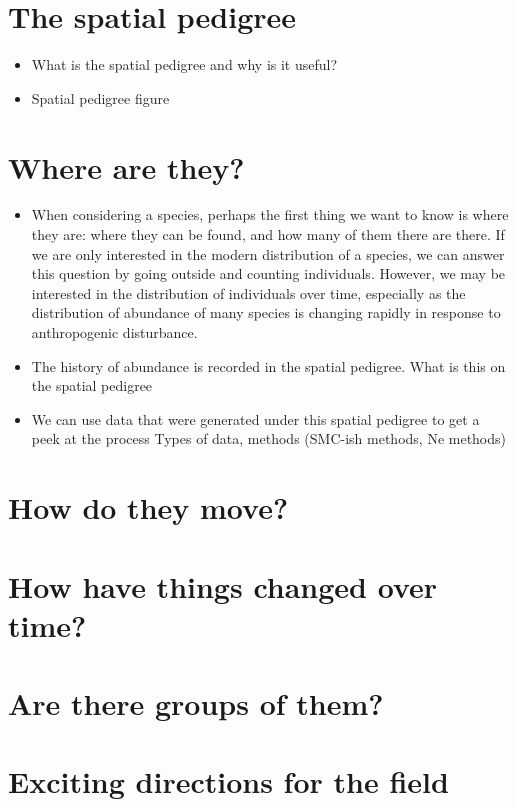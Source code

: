 \documentclass{ar-1col}
\begin{document}
\section{The spatial pedigree}
\begin{itemize}
\item What is the spatial pedigree and why is it useful?
\item Spatial pedigree figure
\end{itemize}

\section{Where are they?}
\begin{itemize}
\item When considering a species, 
perhaps the first thing we want to know is where they are: 
where they can be found, and how many of them there are there.
If we are only interested in the modern distribution of a species, 
we can answer this question by going outside and counting individuals.
However, we may be interested in the distribution of individuals over time, 
especially as the distribution of abundance of many species is changing rapidly 
in response to anthropogenic disturbance.
\item The history of abundance is recorded in the spatial pedigree.
\subitem What is this on the spatial pedigree
\item We can use data that were generated under this spatial pedigree 
to get a peek at the process
\subitem Types of data, methods (SMC-ish methods, Ne methods)
\end{itemize}

\section{How do they move?}

\section{How have things changed over time?}


\section{Are there groups of them?}


\section{Exciting directions for the field}
\end{document}
